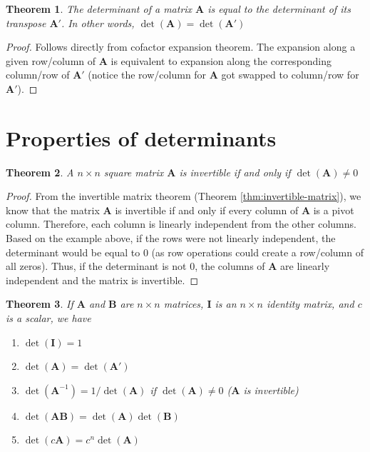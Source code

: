 \documentclass[
]{book}
\newtheorem{theorem}{Theorem}[chapter]
\theoremstyle{definition}
\theoremstyle{definition}
\theoremstyle{definition}
\theoremstyle{definition}
\theoremstyle{remark}
\begin{document}
\begin{theorem}
The determinant of a matrix \(\mathbf{A}\) is equal to the determinant of its transpose \(\mathbf{A}'\). In other words, \(\det(\mathbf{A}) = \det(\mathbf{A}')\)
\end{theorem}

\begin{proof}
Follows directly from cofactor expansion theorem. The expansion along a given row/column of \(\mathbf{A}\) is equivalent to expansion along the corresponding column/row of \(\mathbf{A}'\) (notice the row/column for \(\mathbf{A}\) got swapped to column/row for \(\mathbf{A}'\)).
\end{proof}

\hypertarget{properties-of-determinants}{%
\section{Properties of determinants}\label{properties-of-determinants}}

\begin{theorem}
A \(n \times n\) square matrix \(\mathbf{A}\) is invertible if and only if \(\det(\mathbf{A}) \neq 0\)
\end{theorem}

\begin{proof}
From the invertible matrix theorem (Theorem \ref{thm:invertible-matrix}), we know that the matrix \(\mathbf{A}\) is invertible if and only if every column of \(\mathbf{A}\) is a pivot column. Therefore, each column is linearly independent from the other columns. Based on the example above, if the rows were not linearly independent, the determinant would be equal to 0 (as row operations could create a row/column of all zeros). Thus, if the determinant is not 0, the columns of \(\mathbf{A}\) are linearly independent and the matrix is invertible.
\end{proof}

\begin{theorem}

If \(\mathbf{A}\) and \(\mathbf{B}\) are \(n \times n\) matrices, \(\mathbf{I}\) is an \(n \times n\) identity matrix, and \(c\) is a scalar, we have

\begin{enumerate}
\def\labelenumi{\alph{enumi})}
\item
  \(\det(\mathbf{I}) = 1\)
\item
  \(\det(\mathbf{A}) = \det(\mathbf{A}')\)
\item
  \(\det(\mathbf{A}^{-1}) = 1 / \det(\mathbf{A})\) if \(\det(\mathbf{A}) \neq 0\) (\(\mathbf{A}\) is invertible)
\item
  \(\det(\mathbf{A}\mathbf{B}) = \det(\mathbf{A})\det(\mathbf{B})\)
\item
  \(\det(c\mathbf{A}) = c^n \det(\mathbf{A})\)
\end{enumerate}

\end{theorem}
\end{document}
